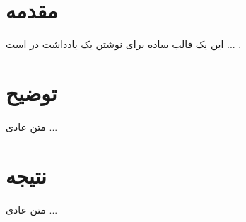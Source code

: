 

\section{
مقدمه
}

این یک قالب ساده برای نوشتن یک یادداشت در
است ... .



\section{
توضیح
}


متن عادی ...



\section{
نتیجه
}


متن عادی ...